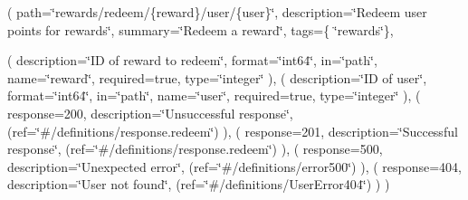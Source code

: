 ( path=\char`\"{}rewards/redeem/\{reward\}/user/\{user\}\char`\"{}, description=\char`\"{}\+Redeem user points for rewards\char`\"{}, summary=\char`\"{}\+Redeem a reward\char`\"{}, tags=\{ \char`\"{}rewards\char`\"{}\},

( description=\char`\"{}\+I\+D of reward to redeem\char`\"{}, format=\char`\"{}int64\char`\"{}, in=\char`\"{}path\char`\"{}, name=\char`\"{}reward\char`\"{}, required=true, type=\char`\"{}integer\char`\"{} ), ( description=\char`\"{}\+I\+D of user\char`\"{}, format=\char`\"{}int64\char`\"{}, in=\char`\"{}path\char`\"{}, name=\char`\"{}user\char`\"{}, required=true, type=\char`\"{}integer\char`\"{} ), ( response=200, description=\char`\"{}\+Unsuccessful response\char`\"{}, (ref=\char`\"{}\#/definitions/response.\+redeem\char`\"{}) ), ( response=201, description=\char`\"{}\+Successful response\char`\"{}, (ref=\char`\"{}\#/definitions/response.\+redeem\char`\"{}) ), ( response=500, description=\char`\"{}\+Unexpected error\char`\"{}, (ref=\char`\"{}\#/definitions/error500\char`\"{}) ), ( response=404, description=\char`\"{}\+User not found\char`\"{}, (ref=\char`\"{}\#/definitions/\+User\+Error404\char`\"{}) ) ) 
